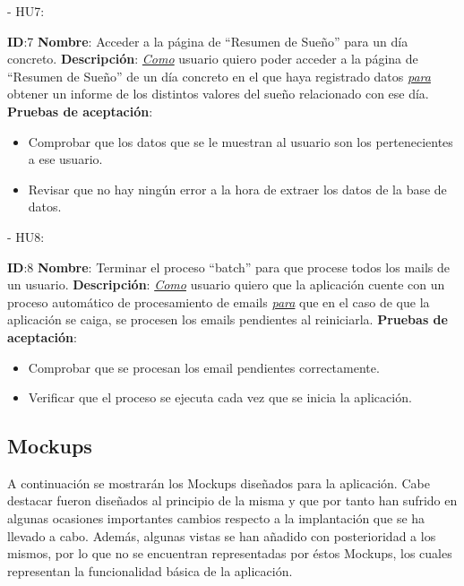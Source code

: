 \documentclass[11pt,openany]{book}
\begin{document}
 
- HU7:
 
\textbf{ID}:7 \textbf{Nombre}: Acceder a la página de ``Resumen de Sueño'' para un día concreto.\linebreak
\textbf{Descripción}: \textit{\underline{Como}} usuario quiero poder acceder a la página de “Resumen de Sueño” de un día concreto en el que haya registrado datos \textit{\underline{para}} obtener un informe de los distintos valores del sueño relacionado con ese día.\linebreak
\textbf{Pruebas de aceptación}:
\begin{itemize}
\item Comprobar que los datos que se le muestran al usuario son los pertenecientes a ese usuario.
\item Revisar que no hay ningún error a la hora de extraer los datos de la base de datos.
\end{itemize}
 
- HU8:
 
\textbf{ID}:8 \textbf{Nombre}: Terminar el proceso ``batch'' para que procese todos los mails de un usuario.\linebreak
\textbf{Descripción}: \textit{\underline{Como}} usuario quiero que la aplicación cuente con un proceso automático de procesamiento de emails \textit{\underline{para}} que en el caso de que la aplicación se caiga, se procesen los emails pendientes al reiniciarla.\linebreak
\textbf{Pruebas de aceptación}:
\begin{itemize}
\item Comprobar que se procesan los email pendientes correctamente.
\item Verificar que el proceso se ejecuta cada vez que se inicia la aplicación.
\end{itemize}

\subsection{Mockups}

A continuación se mostrarán los Mockups diseñados para la aplicación. Cabe destacar fueron diseñados al principio de la misma y que por tanto han sufrido en algunas ocasiones importantes cambios respecto a la implantación que se ha llevado a cabo. Además, algunas vistas se han añadido con posterioridad a los mismos, por lo que no se encuentran representadas por éstos Mockups, los cuales representan la funcionalidad básica de la aplicación.
\end{document}
